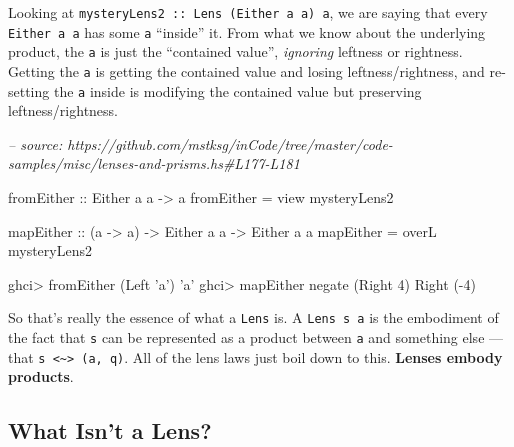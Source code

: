 \documentclass[]{article}
\newenvironment{Shaded}{}{}
\newcommand{\CharTok}[1]{\textcolor[rgb]{0.25,0.44,0.63}{#1}}
\newcommand{\CommentTok}[1]{\textcolor[rgb]{0.38,0.63,0.69}{\textit{#1}}}
\newcommand{\DataTypeTok}[1]{\textcolor[rgb]{0.56,0.13,0.00}{#1}}
\newcommand{\DecValTok}[1]{\textcolor[rgb]{0.25,0.63,0.44}{#1}}
\newcommand{\FunctionTok}[1]{\textcolor[rgb]{0.02,0.16,0.49}{#1}}
\newcommand{\NormalTok}[1]{#1}
\newcommand{\OtherTok}[1]{\textcolor[rgb]{0.00,0.44,0.13}{#1}}
\begin{document}
Looking at \texttt{mysteryLens2\ ::\ Lens\textquotesingle{}\ (Either\ a\ a)\ a},
we are saying that every \texttt{Either\ a\ a} has some \texttt{a} ``inside''
it. From what we know about the underlying product, the \texttt{a} is just the
``contained value'', \emph{ignoring} leftness or rightness. Getting the
\texttt{a} is getting the contained value and losing leftness/rightness, and
re-setting the \texttt{a} inside is modifying the contained value but preserving
leftness/rightness.

\begin{Shaded}
\begin{Highlighting}[]
\CommentTok{-- source: https://github.com/mstksg/inCode/tree/master/code-samples/misc/lenses-and-prisms.hs#L177-L181}

\OtherTok{fromEither ::} \DataTypeTok{Either}\NormalTok{ a a }\OtherTok{->}\NormalTok{ a}
\NormalTok{fromEither }\FunctionTok{=}\NormalTok{ view mysteryLens2}

\OtherTok{mapEither ::}\NormalTok{ (a }\OtherTok{->}\NormalTok{ a) }\OtherTok{->} \DataTypeTok{Either}\NormalTok{ a a }\OtherTok{->} \DataTypeTok{Either}\NormalTok{ a a}
\NormalTok{mapEither }\FunctionTok{=}\NormalTok{ overL mysteryLens2}
\end{Highlighting}
\end{Shaded}

\begin{Shaded}
\begin{Highlighting}[]
\NormalTok{ghci}\FunctionTok{>}\NormalTok{ fromEither (}\DataTypeTok{Left} \CharTok{'a'}\NormalTok{)}
\CharTok{'a'}
\NormalTok{ghci}\FunctionTok{>}\NormalTok{ mapEither negate (}\DataTypeTok{Right} \DecValTok{4}\NormalTok{)}
\DataTypeTok{Right}\NormalTok{ (}\FunctionTok{-}\DecValTok{4}\NormalTok{)}
\end{Highlighting}
\end{Shaded}

So that's really the essence of what a \texttt{Lens\textquotesingle{}} is. A
\texttt{Lens\textquotesingle{}\ s\ a} is the embodiment of the fact that
\texttt{s} can be represented as a product between \texttt{a} and something else
--- that \texttt{s\ \textless{}\textasciitilde{}\textgreater{}\ (a,\ q)}. All of
the lens laws just boil down to this. \textbf{Lenses embody products}.

\hypertarget{what-isnt-a-lens}{%
\subsection{What Isn't a Lens?}\label{what-isnt-a-lens}}
\end{document}
